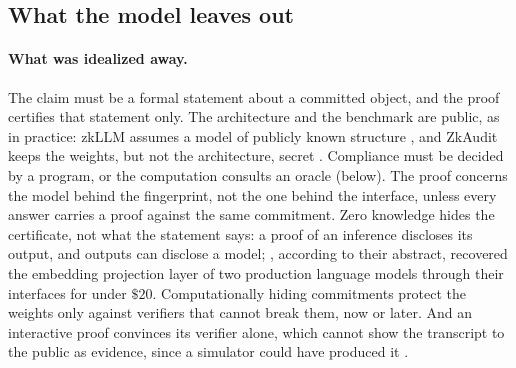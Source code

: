 \begin{refsection}

\section{What the model leaves out}\label{sec:zeroknowledge:leaves}

\paragraph{What was idealized away.} The claim must be a formal statement about a committed object, and the proof certifies that statement only. The architecture and the benchmark are public, as in practice: zkLLM assumes a model of publicly known structure \parencite[Section~3.6]{SunLiZhang2024}, and ZkAudit keeps the weights, but not the architecture, secret \parencite{WaiwitlikhitEtAl2024}. Compliance must be decided by a program, or the computation consults an oracle (below). The proof concerns the model behind the fingerprint, not the one behind the interface, unless every answer carries a proof against the same commitment. Zero knowledge hides the certificate, not what the statement says: a proof of an inference discloses its output, and outputs can disclose a model; \textcite{CarliniEtAl2024}, according to their abstract, recovered the embedding projection layer of two production language models through their interfaces for under $\$20$. Computationally hiding commitments protect the weights only against verifiers that cannot break them, now or later. And an interactive proof convinces its verifier alone, which cannot show the transcript to the public as evidence, since a simulator could have produced it \parencite{BrassardChaumCrepeau1988}.


\end{refsection}
